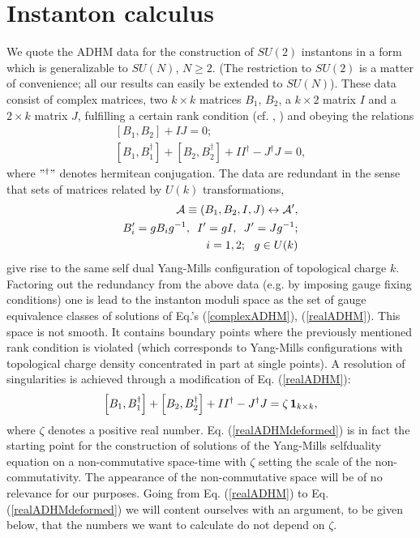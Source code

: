 \documentclass[a4paper,12pt]{article}
\begin{document}
\section{Instanton calculus}
\renewcommand{\theequation}{2.\arabic{equation}}
We quote the ADHM data for the construction of $SU(2)$ instantons
in a form which is generalizable to $SU(N)$, $N\geq 2$. (The
restriction to $SU(2)$ is a matter of convenience; all our results
can easily be extended to $SU(N)$). These data consist of complex
matrices, two $k\times k$ matrices $B_1$, $B_2$, a $k\times 2$
matrix $I$ and a $2\times k$ matrix $J$, fulfilling a certain rank
condition (cf. \cite{adhm}, \cite{DKM'}) and obeying the relations
\begin{eqnarray}
\label{complexADHM}
\left[ B_1, B_2\right]+IJ=0; \\
\label{realADHM} \left[ B_1, B_1^{\dagger}\right]+\left[ B_2, B_2^{\dagger}\right]+II^{\dagger}-J^{\dagger}J=0,
\end{eqnarray}
where $"^{\dagger}"$ denotes hermitean conjugation. The data are redundant in the sense that sets of matrices
related by $U(k)$ transformations,
\begin{eqnarray}
{\cal A}\equiv \left(B_1, B_2, I, J\right)\leftrightarrow {\cal A}^{\prime}, \nonumber \\
B_i^{\prime}=gB_ig^{-1}, \, \, \, I^{\prime}=gI, \, \, \, J^{\prime}=Jg^{-1}; \nonumber \\
i=1,2; \, \, \, \, g\in U(k)
\end{eqnarray}
give rise to the same self dual Yang-Mills configuration of
topological charge $k$. Factoring out the redundancy from the
above data (e.g. by imposing gauge fixing conditions) one is lead
to the instanton moduli space as the set of gauge equivalence
classes of solutions of Eq.'s (\ref{complexADHM}),
(\ref{realADHM}). This space is not smooth. It contains boundary
points where the previously mentioned rank condition is violated
(which corresponds to Yang-Mills configurations with topological
charge density concentrated in part at single points). A
resolution of singularities is achieved \cite{Nak} through a
modification of Eq. (\ref{realADHM}):
\begin{equation}
\label{realADHMdeformed} \left[ B_1, B_1^{\dagger}\right]+\left[ B_2,
B_2^{\dagger}\right]+II^{\dagger}-J^{\dagger}J=\zeta \, {\bf 1}_{k \times k},
\end{equation}
where $\zeta$ denotes a positive real number. Eq.
(\ref{realADHMdeformed}) is in fact the starting point for the
construction of solutions of the Yang-Mills selfduality  equation
on a non-commutative space-time \cite{NSch} with $\zeta$ setting
the scale of the non-commutativity. The appearance of the
non-commutative space will be of no relevance for our purposes.
Going from Eq. (\ref{realADHM}) to Eq. (\ref{realADHMdeformed}) we
will content ourselves with an argument, to be given below, that
the numbers we want to calculate do not depend on $\zeta$.
\end{document}
